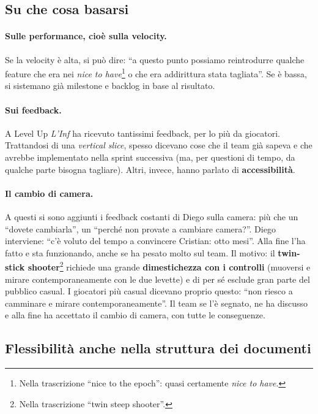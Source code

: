 \subsection{Su che cosa basarsi}

\paragraph{Sulle performance, cioè sulla velocity.} Se la velocity è alta, si
può dire: ``a questo punto possiamo reintrodurre qualche feature che era nei
\emph{nice to have}\footnote{Nella trascrizione ``nice to the epoch'': quasi
certamente \emph{nice to have}.} o che era addirittura stata tagliata''. Se è
bassa, si sistemano già milestone e backlog in base al risultato.

\paragraph{Sui feedback.} A Level Up \emph{L'Inf} ha ricevuto tantissimi
feedback, per lo più da giocatori. Trattandosi di una \emph{vertical slice},
spesso dicevano cose che il team già sapeva e che avrebbe implementato nella
sprint successiva (ma, per questioni di tempo, da qualche parte bisogna
tagliare). Altri, invece, hanno parlato di \textbf{accessibilità}.

\paragraph{Il cambio di camera.} A questi si sono aggiunti i feedback costanti
di Diego sulla camera: più che un ``dovete cambiarla'', un ``perché non provate a
cambiare camera?''. Diego interviene: ``c'è voluto del tempo a convincere
Cristian: otto mesi''. Alla fine l'ha fatto e sta funzionando, anche se ha
pesato molto sul team. Il motivo: il \textbf{twin-stick shooter}\footnote{Nella
trascrizione ``twin steep shooter''.} richiede una grande
\textbf{dimestichezza con i controlli} (muoversi e mirare contemporaneamente con
le due levette) e di per sé esclude gran parte del pubblico casual. I giocatori
più casual dicevano proprio questo: ``non riesco a camminare e mirare
contemporaneamente''. Il team se l'è segnato, ne ha discusso e alla fine ha
accettato il cambio di camera, con tutte le conseguenze.

\subsection{Flessibilità anche nella struttura dei documenti}

